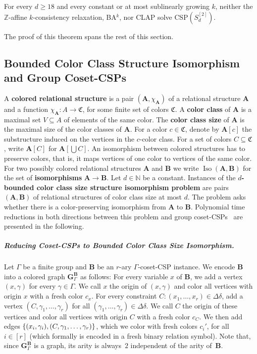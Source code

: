 \documentclass[a4paper,english, thm-restate]{lipics-v2021}
\newcommand{\ZZ}{\mathbb{Z}}
\newcommand{\defining}[1]{\textbf{#1}}
\DeclarePairedDelimiter\set{\lbrace}{\rbrace}
\newcommand{\CFIsym}{\mathbf{G}}
\newcommand{\CFIA}[2]{\CFIsym_{#1}^{#2}}
\newcommand{\StructA}{\mathbf{A}}
\newcommand{\StructB}{\mathbf{B}}
\newcommand{\CSP}[1]{\mathrm{CSP}(#1)}
\newcommand{\bbN}{\mathbb{N}}
\newcommand{\isos}[2]{\operatorname*{Iso}(#1,#2)}
\newcommand{\colors}{\mathfrak{C}}
\newcommand{\CosetGrpTmplt}[2]{#1^{[#2]}}
\newcommand{\Sym}[1]{S_{#1}}
\begin{document}
	\begin{theorem}
		\label{thm:counterexampleSymmetricGroup}
		For every $d \geq 18$ and every constant or at most sublinearly growing $k$, neither the $\ZZ$-affine $k$-consistency relaxation, BA$^{k}$, nor CLAP solve $\CSP{\CosetGrpTmplt{\Sym{d}}{2}}$. 
	\end{theorem}	
	
	\noindent The proof of this theorem spans the rest of this section. 
	
	
	\subsection{Bounded Color Class Structure Isomorphism and Group Coset-CSPs}
	
	A \defining{colored relational structure} is a pair $(\StructA,\chi_\StructA)$
	of a relational structure $\StructA$ and a function $\chi_\StructA \colon A \to
	\colors$, for some finite set of colors $\colors$.
	A \defining{color class} of $\StructA$ is a maximal set $V \subseteq A$ of elements
	of the same color.
	The \defining{color class size} of $\StructA$ is the maximal size of the color classes of $\StructA$.
	For a  color $c \in \colors$, denote by $\StructA[c]$ the substructure induced
	on the vertices in the $c$-color class.
	For a set of colors $C\subseteq \colors$, write $\StructA[C]$ for $\StructA[\bigcup C]$.
	An isomorphism between colored structures has to preserve colors,
	that is, it maps vertices of one color to vertices of the same color.
	For two possibly colored relational structures $\StructA$ and $\StructB$ we write $\isos{\StructA}{\StructB}$ for the set of \defining{isomorphisms} $\StructA \to \StructB$.
	Let $d \in \bbN$ be a constant.
	Instances of the \defining{$d$-bounded color class size structure isomorphism problem} are pairs $(\StructA, \StructB)$ of relational structures
	of color class size at most $d$. The problem asks whether there is a color-preserving isomorphism from $\StructA$ to $\StructB$.
	Polynomial time reductions in both directions between this problem and group coset-CSPs~\cite{BerkholzGrohe2017} are presented in the following.
	
	\subparagraph*{Reducing Coset-CSPs to Bounded Color Class Size Isomorphism.}
	Let $\Gamma$ be a finite group and $\StructB$ be an $r$-ary $\Gamma$-coset-CSP instance.
	We encode $\StructB$ into a colored graph $\CFIA{\Gamma}{\StructB}$ as follows:
	For every variable $x$ of $\StructB$,
	we add a vertex $(x,\gamma)$ for every $\gamma \in \Gamma$.
	We call $x$ the origin of $(x,\gamma)$ and color
	all vertices with origin $x$ with a fresh color $c_x$.
	For every constraint $C\colon (x_1,\dots, x_r) \in \Delta\delta$,
	add a vertex $(C, \gamma_1,\dots, \gamma_r)$
	for all $(\gamma_1,\dots, \gamma_r) \in \Delta\delta$.
	We call $C$ the origin of these vertices and color
	all vertices with origin $C$ with a fresh color $c_C$.
	We then add edges $\set{(x_i,\gamma_i), (C, \gamma_1,\dots, \gamma_r)}$,
	which we color with fresh colors $c_i'$,
	for all $i \in [r]$ (which formally is encoded in a fresh binary relation symbol).
	Note that, since $\CFIA{\Gamma}{\StructB}$ is a graph,
	its arity is always~$2$ independent of the arity of~$\StructB$.
	
\end{document}
